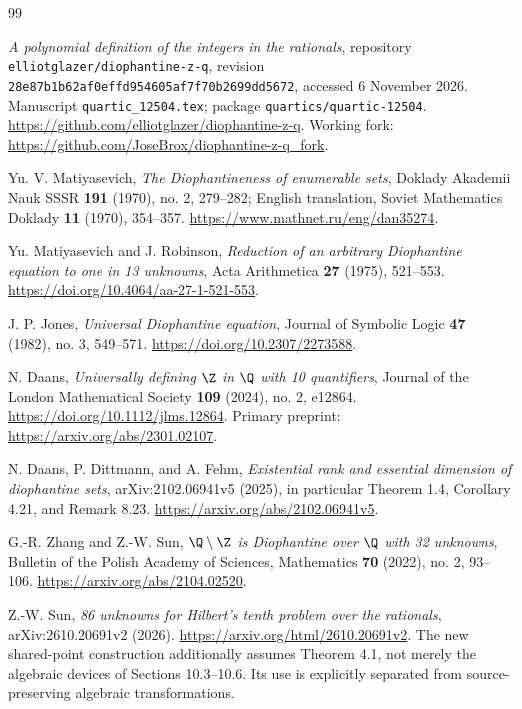 \begin{thebibliography}{99}

\emph{A polynomial definition of the integers in the rationals},
repository \texttt{elliotglazer/diophantine-z-q}, revision
\texttt{28e87b1b62af0effd954605af7f70b2699dd5672}, accessed
6 November 2026. Manuscript \texttt{quartic\_12504.tex}; package
\texttt{quartics/quartic-12504}.
\url{https://github.com/elliotglazer/diophantine-z-q}.
Working fork: \url{https://github.com/JoseBrox/diophantine-z-q_fork}.

Yu. V. Matiyasevich, \emph{The Diophantineness of enumerable sets},
Doklady Akademii Nauk SSSR \textbf{191} (1970), no. 2, 279--282;
English translation, Soviet Mathematics Doklady \textbf{11} (1970),
354--357. \url{https://www.mathnet.ru/eng/dan35274}.

Yu. Matiyasevich and J. Robinson, \emph{Reduction of an arbitrary
Diophantine equation to one in 13 unknowns}, Acta Arithmetica
\textbf{27} (1975), 521--553.
\url{https://doi.org/10.4064/aa-27-1-521-553}.

J. P. Jones, \emph{Universal Diophantine equation}, Journal of Symbolic
Logic \textbf{47} (1982), no. 3, 549--571.
\url{https://doi.org/10.2307/2273588}.

N. Daans, \emph{Universally defining $\Z$ in $\Q$ with 10 quantifiers},
Journal of the London Mathematical Society \textbf{109} (2024), no. 2,
e12864. \url{https://doi.org/10.1112/jlms.12864}.
Primary preprint: \url{https://arxiv.org/abs/2301.02107}.

N. Daans, P. Dittmann, and A. Fehm, \emph{Existential rank and
essential dimension of diophantine sets}, arXiv:2102.06941v5 (2025),
in particular Theorem 1.4, Corollary 4.21, and Remark 8.23.
\url{https://arxiv.org/abs/2102.06941v5}.

G.-R. Zhang and Z.-W. Sun, \emph{$\Q\setminus\Z$ is Diophantine
over $\Q$ with 32 unknowns}, Bulletin of the Polish Academy of Sciences,
Mathematics \textbf{70} (2022), no. 2, 93--106.
\url{https://arxiv.org/abs/2104.02520}.

Z.-W. Sun, \emph{86 unknowns for Hilbert's tenth problem over the
rationals}, arXiv:2610.20691v2 (2026).
\url{https://arxiv.org/html/2610.20691v2}.
The new shared-point construction additionally assumes Theorem 4.1,
not merely the algebraic devices of Sections 10.3--10.6. Its use is
explicitly separated from source-preserving algebraic transformations.


\end{thebibliography}
